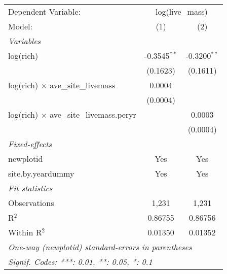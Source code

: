 \begin{tabular}{lcc}
\tabularnewline\midrule\midrule
Dependent Variable:&\multicolumn{2}{c}{log(live\_mass)}\\
Model:&(1) & (2)\\
\midrule \emph{Variables}&   &  \\
log(rich)&-0.3545$^{**}$ & -0.3200$^{**}$\\
  &(0.1623) & (0.1611)\\
log(rich) $\times $ ave\_site\_livemass&0.0004 &   \\
  &(0.0004) &   \\
log(rich) $\times $ ave\_site\_livemass.peryr&   & 0.0003\\
  &   & (0.0004)\\
\midrule \emph{Fixed-effects}&   &  \\
newplotid & Yes & Yes\\
site.by.yeardummy & Yes & Yes\\
\midrule \emph{Fit statistics}&  & \\
Observations & 1,231&1,231\\
R$^2$ & 0.86755&0.86756\\
Within R$^2$ & 0.01350&0.01352\\
\midrule\midrule\multicolumn{3}{l}{\emph{One-way (newplotid) standard-errors in parentheses}}\\
\multicolumn{3}{l}{\emph{Signif. Codes: ***: 0.01, **: 0.05, *: 0.1}}\\
\end{tabular}


